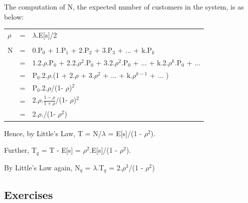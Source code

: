 \documentclass[12pt,fleqn]{report}
\begin{document}
The computation of N, the expected number of customers in the system,
is as below:

\begin{tabular}{ l c l }
$\rho$ & = & $\lambda$.E[s]/2 \\
&&\\
N & = & 0.P$_0$ + 1.P$_1$ + 2.P$_2$ + 3.P$_3$ + ... + k.P$_k$ \\
  & = & 1.2.$\rho$.P$_0$ + 2.2.$\rho^2$.P$_0$ + 3.2.$\rho^2$.P$_0$ + 
            ... + k.2.$\rho^k$.P$_0$ +  ... \\
  & = & P$_0$.2.$\rho$.(1 + 2.$\rho$ + 3.$\rho^2$ + ... + k.$\rho^{k-1}$ + ... )\\
  & = & P$_0$.2.$\rho$/(1- $\rho$)$^2$\\
  & = & 2.$\rho$.$\frac{1 - \rho}{1 + \rho}$/(1- $\rho$)$^2$\\
  & = & 2.$\rho$./(1- $\rho^2$)\\
\end{tabular}

Hence, by Little's Law, T = N/$\lambda$ = E[s]/(1 - $\rho^2$).


Further, T$_q$ = T - E[s] = $\rho^2$.E[s]/(1 - $\rho^2$).

By Little's Law again, N$_q$ = $\lambda$.T$_q$ = 2.$\rho^3$/(1 - $\rho^2$)

\subsection*{Exercises}
\end{document}
